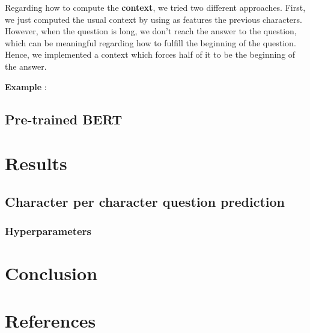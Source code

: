 \documentclass{article}
\begin{document}
Regarding how to compute the \textbf{context}, we tried two different approaches. First, we just computed the usual context by using as features the previous characters. However, when the question is long, we don't reach the answer to the question, which can be meaningful regarding how to fulfill the beginning of the question. Hence, we implemented a context which forces half of it to be the beginning of the answer.
\newline \newline

\textbf{Example} :

\subsection{Pre-trained BERT}

\section{Results}

\subsection{Character per character question prediction}

\subsubsection{Hyperparameters}

\section{Conclusion}

\medskip

\section{References}

\printbibliography
\end{document}
